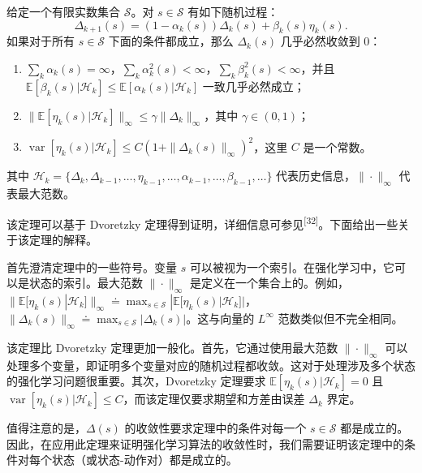 \begin{theorem}\label{thm:rl-sa-dvor-ext}
给定一个有限实数集合 $\mathcal{S}$。对 $s \in \mathcal{S}$ 有如下随机过程：
\begin{equation}
\Delta_{k+1}(s) = (1 - \alpha_k(s)) \Delta_k(s) + \beta_k(s) \eta_k(s).
\end{equation}
如果对于所有 $s \in \mathcal{S}$ 下面的条件都成立，那么 $\Delta_k(s)$ 几乎必然收敛到 0：
\begin{enumerate}
  \item[(a)] $\sum_k \alpha_k(s) = \infty$，$\sum_k \alpha_k^2(s) < \infty$，$\sum_k \beta_k^2(s) < \infty$，并且 $\mathbb{E}[\beta_k(s) | \mathcal{H}_k] \leqslant \mathbb{E}[\alpha_k(s) | \mathcal{H}_k]$ 一致几乎必然成立；
  \item[(b)] $\| \mathbb{E}[\eta_k(s) | \mathcal{H}_k] \|_\infty \leqslant \gamma \| \Delta_k \|_\infty$，其中 $\gamma \in (0, 1)$；
  \item[(c)] $\operatorname{var}[\eta_k(s) | \mathcal{H}_k] \leqslant C (1 + \| \Delta_k(s) \|_\infty)^2$，这里 $C$ 是一个常数。
\end{enumerate}
其中 $\mathcal{H}_k = \{\Delta_k, \Delta_{k-1}, \ldots, \eta_{k-1}, \ldots, \alpha_{k-1}, \ldots, \beta_{k-1}, \ldots\}$ 代表历史信息，$\| \cdot \|_\infty$ 代表最大范数。
\end{theorem}

该定理可以基于 Dvoretzky 定理得到证明，详细信息可参见\textsuperscript{[32]}。下面给出一些关于该定理的解释。

首先澄清定理中的一些符号。变量 $s$ 可以被视为一个索引。在强化学习中，它可以是状态的索引。最大范数 $\| \cdot \|_\infty$ 是定义在一个集合上的。例如，$\| \mathbb{E}[\eta_k(s) | \mathcal{H}_k] \|_\infty \doteq \max_{s \in \mathcal{S}} |\mathbb{E}[\eta_k(s) | \mathcal{H}_k]|$，$\| \Delta_k(s) \|_\infty \doteq \max_{s \in \mathcal{S}} |\Delta_k(s)|$。这与向量的 $L^\infty$ 范数类似但不完全相同。

该定理比 Dvoretzky 定理更加一般化。首先，它通过使用最大范数 $\| \cdot \|_\infty$ 可以处理多个变量，即证明多个变量对应的随机过程都收敛。这对于处理涉及多个状态的强化学习问题很重要。其次，Dvoretzky 定理要求 $\mathbb{E}[\eta_k(s) | \mathcal{H}_k] = 0$ 且 $\operatorname{var}[\eta_k(s) | \mathcal{H}_k] \leqslant C$，而该定理仅要求期望和方差由误差 $\Delta_k$ 界定。

值得注意的是，$\Delta(s)$ 的收敛性要求定理中的条件对每一个 $s \in \mathcal{S}$ 都是成立的。因此，在应用此定理来证明强化学习算法的收敛性时，我们需要证明该定理中的条件对每个状态（或状态-动作对）都是成立的。

